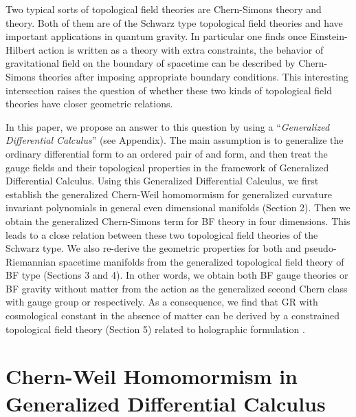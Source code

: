 \documentclass[a4paper,twocolumn,showpacs,prd]{revtex4}
\begin{document}
Two typical sorts of topological field theories are Chern-Simons
theory and \coordHE{} theory\cite{Horowitz,BBRT}. Both of them are of
the Schwarz type topological field theories and have important
applications in quantum gravity. In particular one finds once
Einstein-Hilbert action is written as a \coordHE{} theory with extra
constraints, the behavior of gravitational field on the boundary
of spacetime can be described by Chern-Simons theories after
imposing appropriate boundary conditions. This interesting
intersection raises the question of whether these two kinds of
topological field theories have closer geometric relations.

In this paper, we propose an answer to this question by using a
``{\it Generalized Differential Calculus}'' (see
Appendix)\cite{Sparling,NR2001}. The main assumption is to
generalize the ordinary differential \coordHE{}form to an ordered pair
of \coordHE{} and \coordHE{}form, and then treat the gauge fields and their
topological properties in the framework of Generalized
Differential Calculus. Using this Generalized Differential
Calculus, we first establish the generalized Chern-Weil
homomormism for generalized curvature invariant polynomials in
general even dimensional manifolds (Section 2). Then we obtain the
generalized Chern-Simons term for BF theory in four dimensions.
This leads to a close relation between these two topological field
theories of the Schwarz type. We also re-derive the geometric
properties for both \coordHE{} and pseudo-Riemannian spacetime
manifolds from the generalized topological field theory of BF type
(Sections 3 and 4). In other words, we obtain both BF gauge
theories or BF gravity without matter from the action as the
generalized second Chern class with gauge group \coordHE{} or \coordHE{}
respectively. As a consequence, we find that GR with cosmological
constant in the absence of matter can be derived by a constrained
topological field theory (Section 5) related to holographic
formulation \cite{Smolin}.

\section{Chern-Weil Homomormism in Generalized Differential Calculus}
\end{document}
